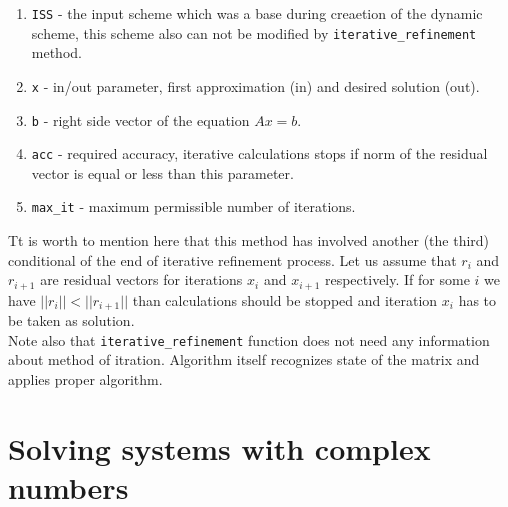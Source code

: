 \begin{enumerate}
	\item \texttt{ISS} - the input scheme which was a base during creaetion of the dynamic scheme, this scheme also can not be modified by \texttt{iterative\_refinement} method.
	\item \texttt{x} - in/out parameter, first approximation (in) and desired solution (out).
	\item \texttt{b} - right side vector of the equation $Ax=b$.
	\item \texttt{acc} - required accuracy, iterative calculations stops if norm of the residual vector is equal or less than this parameter.
	\item \texttt{max\_it} - maximum permissible number of iterations.
\end{enumerate}
\indent Tt is worth to mention here that this method has involved another (the third) conditional of the end of iterative refinement process. Let us assume that $r_i$ and $r_{i+1}$ are residual vectors for iterations $x_i$ and $x_{i+1}$ respectively. If for some $i$ we have   
$||r_i|| < ||r_{i+1}||$ than calculations should be stopped and iteration $x_i$ has to be taken as solution.\\
\indent Note also that \texttt{iterative\_refinement} function does not need any information about method of itration. Algorithm itself recognizes state of the matrix and applies proper algorithm.

\section{Solving systems with complex numbers}

